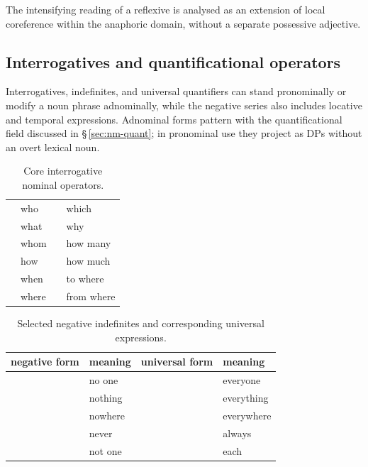 The intensifying  reading of a reflexive is analysed as an extension
of local coreference within the anaphoric domain, without a separate possessive
adjective.

\subsection{Interrogatives and quantificational operators}
\label{sec:nm-pron-operators}

Interrogatives, indefinites, and universal quantifiers can stand pronominally
or modify a noun phrase adnominally, while the negative series also includes
locative and temporal expressions. Adnominal forms pattern with the
quantificational field discussed in §\,\ref{sec:nm-quant}; in pronominal use they project as DPs without an overt lexical noun.

\begin{table}[ht]
  \footnotesize
  \caption{Core interrogative nominal operators.}
  \label{tab:nm-interrogatives}
  \begin{tabularx}{0.8\textwidth}{L L L L}
    \toprule
     & who &  & which \\
     & what &  & why \\
     & whom &  & how many \\
     & how &  & how much \\
     & when &  & to where \\
     & where &  & from where \\
    \bottomrule
  \end{tabularx}
\end{table}

\begin{table}[ht]
  \footnotesize
  \caption{Selected negative indefinites and corresponding universal expressions.}
  \label{tab:nm-indefinites}
  \begin{tabularx}{0.8\textwidth}{L L L L}
    \toprule
    {\sc negative form} & {\sc meaning} & {\sc universal form} &
    {\sc meaning} \\
    \midrule
     & no one &  & everyone \\
     & nothing &  & everything \\
     & nowhere &  & everywhere \\
     & never &  & always \\
     & not one &  & each \\
    \bottomrule
  \end{tabularx}
\end{table}

